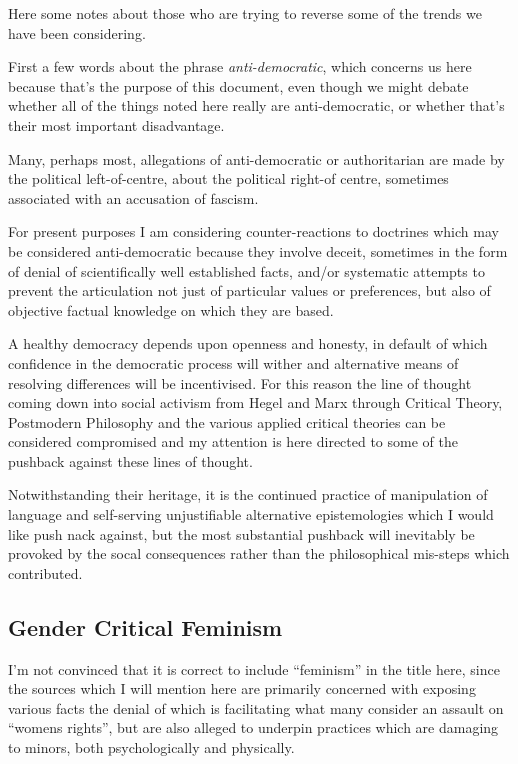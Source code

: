\documentclass[10pt,titlepage]{book}
\begin{document}
Here some notes about those who are trying to reverse some of the  trends we have been considering.

First a few words about the phrase \emph{anti-democratic}, which concerns us here because that's the purpose of this document, even though we might debate whether all of the things noted here really are anti-democratic, or whether that's their most important disadvantage.

Many, perhaps most, allegations of anti-democratic or authoritarian are made by the political left-of-centre, about the political right-of centre, sometimes associated with an accusation of fascism.

For present purposes I am considering counter-reactions to doctrines which may be considered anti-democratic because they involve deceit, sometimes in the form of denial of scientifically well established facts, and/or systematic attempts to prevent the articulation not just of particular values or preferences, but also of objective factual knowledge on which they are based.

A healthy democracy depends upon openness and honesty, in default of which confidence in the democratic process will wither and alternative means of resolving differences will be incentivised.
For this reason the line of thought coming down into social activism from Hegel and Marx through Critical Theory, Postmodern Philosophy and the various applied critical theories can be considered compromised and my attention is here directed to some of the pushback against these lines of thought.

Notwithstanding their heritage, it is the continued practice of manipulation of language and self-serving unjustifiable alternative epistemologies which I would like push nack against, but the most substantial pushback will inevitably be provoked by the socal consequences rather than the philosophical mis-steps which contributed.

\subsection{Gender Critical Feminism}

I'm not convinced that it is correct to include ``feminism'' in the title here, since the sources which I will mention here are primarily concerned with exposing various facts the denial of which is facilitating what many consider an assault on ``womens rights'', but are also alleged to underpin practices which are damaging to minors, both psychologically and physically.




{}








\end{document}
